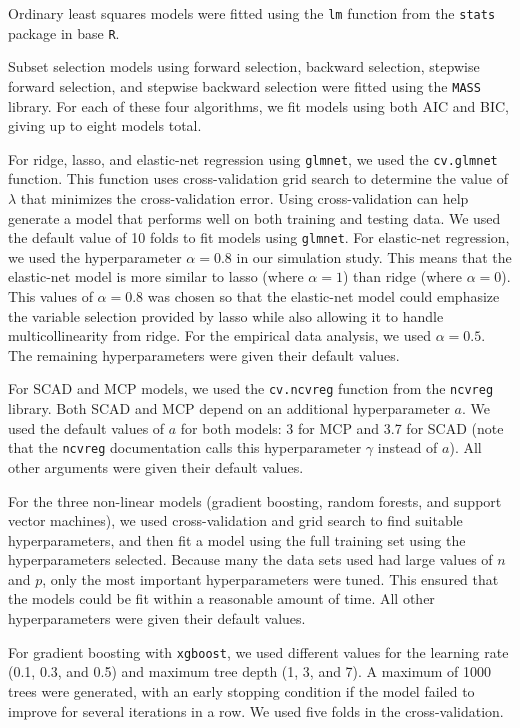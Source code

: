 \documentclass{article}
\begin{document}
Ordinary least squares models were fitted using the \lstinline!lm! function from the \lstinline!stats! package in base \lstinline!R!.

Subset selection models using forward selection, backward selection, stepwise forward selection, and stepwise backward selection were fitted using the \lstinline!MASS! library. For each of these four algorithms, we fit models using both AIC and BIC, giving up to eight models total.

For ridge, lasso, and elastic-net regression using \lstinline!glmnet!, we used the \lstinline!cv.glmnet! function. This function uses cross-validation grid search to determine the value of $\lambda$ that minimizes the cross-validation error. Using cross-validation can help generate a model that performs well on both training and testing data. We used the default value of 10 folds to fit models using \lstinline!glmnet!. For elastic-net regression, we used the hyperparameter $\alpha = 0.8$ in our simulation study. This means that the elastic-net model is more similar to lasso (where $\alpha = 1$) than ridge (where $\alpha = 0$). This values of $\alpha = 0.8$ was chosen so that the elastic-net model could emphasize the variable selection provided by lasso while also allowing it to handle multicollinearity from ridge. For the empirical data analysis, we used $\alpha = 0.5$. The remaining hyperparameters were given their default values.

For SCAD and MCP models, we used the \lstinline!cv.ncvreg! function from the \lstinline!ncvreg! library. Both SCAD and MCP depend on an additional hyperparameter $a$. We used the default values of $a$ for both models: 3 for MCP and 3.7 for SCAD (note that the \lstinline!ncvreg! documentation calls this hyperparameter $\gamma$ instead of $a$). All other arguments were given their default values. 

For the three non-linear models (gradient boosting, random forests, and support vector machines), we used cross-validation and grid search to find suitable hyperparameters, and then fit a model using the full training set using the hyperparameters selected. Because many the data sets used had large values of $n$ and $p$, only the most important hyperparameters were tuned. This ensured that the models could be fit within a reasonable amount of time. All other hyperparameters were given their default values.

For gradient boosting with \lstinline!xgboost!, we used different values for the learning rate (0.1, 0.3, and 0.5) and maximum tree depth (1, 3, and 7). A maximum of 1000 trees were generated, with an early stopping condition if the model failed to improve for several iterations in a row. We used five folds in the cross-validation.
\end{document}
